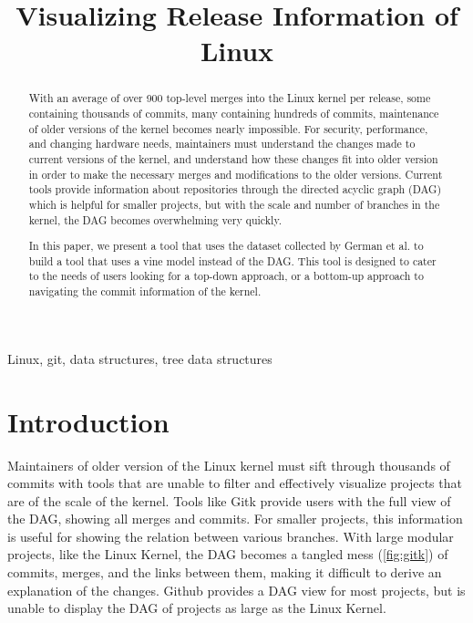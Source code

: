 \documentclass[conference, draftclsnofoot]{IEEEtran}
\makeatletter
\newcommand{\TheTitle}{Visualizing Release Information of Linux}
\newcommand{\TheAuthors}{Evan Wilde}
\newcommand{\TheEmails}{etcwilde@uvic.ca}
\newcommand{\TheKeywords}{Linux, git, data structures, tree data structures}
\makeatother
\begin{document}
\title{\TheTitle}
\author{
\IEEEauthorblockA{\TheAuthors}
\IEEEauthorblockA{Email: \TheEmails}
}
\maketitle
\begin{abstract}

	With an average of over 900 top-level merges into the Linux kernel per
	release, some containing thousands of commits, many containing hundreds
	of commits, maintenance of older versions of the kernel becomes nearly
	impossible. For security, performance, and changing hardware needs,
	maintainers must understand the changes made to current versions of the
	kernel, and understand how these changes fit into older version in
        order to make the necessary merges and modifications to the older
        versions. Current tools provide information about repositories through
        the directed acyclic graph (DAG) which is helpful for smaller projects,
        but with the scale and number of branches in the kernel, the DAG
        becomes overwhelming very quickly.

	In this paper, we present a tool that uses the dataset collected by
	German et al. to build a tool that uses a vine model instead of the
	DAG. This tool is designed to cater to the needs of users looking for a
	top-down approach, or a bottom-up approach to navigating the commit
	information of the kernel.
\end{abstract}

\begin{IEEEkeywords}
\TheKeywords
\end{IEEEkeywords}

\section{Introduction}

Maintainers of older version of the Linux kernel must sift through thousands of
commits with tools that are unable to filter and effectively visualize projects
that are of the scale of the kernel. Tools like Gitk provide users with the
full view of the DAG, showing all merges and commits. For smaller projects,
this information is useful for showing the relation between various branches.
With large modular projects, like the Linux Kernel, the DAG becomes a tangled
mess (\ref{fig:gitk}) of commits, merges, and the links between them, making it
difficult to derive an explanation of the changes.  Github provides a DAG view
for most projects, but is unable to display the DAG of projects as large as the
Linux Kernel.
\end{document}
